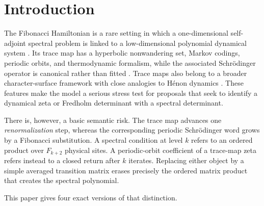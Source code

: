 \section{Introduction}

The Fibonacci Hamiltonian is a rare setting in which a one-dimensional
self-adjoint spectral problem is linked to a low-dimensional polynomial
dynamical system \citep{kohmoto1983}.  Its trace map has a hyperbolic
nonwandering set, Markov codings, periodic orbits, and thermodynamic
formalism, while the associated Schr{\"o}dinger operator is canonical rather
than fitted \citep{casdagli1986,damanik2016}.  Trace maps also belong to a
broader character-surface framework with close analogies to H{\'e}non
dynamics \citep{cantat2009}.  These features make the model a serious stress
test for proposals that seek to identify a dynamical zeta or Fredholm
determinant with a spectral determinant.

There is, however, a basic semantic risk.  The trace map advances one
\emph{renormalization} step, whereas the corresponding periodic
Schr{\"o}dinger word grows by a Fibonacci substitution.  A spectral condition
at level \(k\) refers to an ordered product over \(F_{k+2}\) physical sites.
A periodic-orbit coefficient of a trace-map zeta refers instead to a closed
return after \(k\) iterates.  Replacing either object by a simple averaged
transition matrix erases precisely the ordered matrix product that creates
the spectral polynomial.

This paper gives four exact versions of that distinction.

